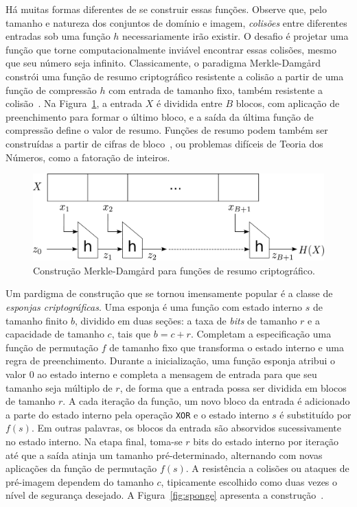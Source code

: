 Há muitas formas diferentes de se construir essas funções.
Observe que, pelo tamanho e natureza dos conjuntos de domínio e imagem, \emph{colisões} entre diferentes entradas sob uma função $h$ necessariamente irão existir. O desafio é projetar uma função que torne computacionalmente inviável encontrar essas colisões, mesmo que seu número seja infinito.
Classicamente, o paradigma Merkle-Damg\aa rd constrói uma função de resumo criptográfico resistente a colisão a partir de uma função de compressão $h$ com entrada de tamanho fixo, também resistente a colisão~\cite{Merkle79,Damgard89a}. Na Figura~\ref{fig:merkle}, a entrada $X$ é dividida entre $B$ blocos, com aplicação de preenchimento para formar o último bloco, e a saída da última função de compressão define o valor de resumo. Funções de resumo podem também ser construídas a partir de cifras de bloco~\cite{PreneelGV93}, ou problemas difíceis de Teoria dos Números, como a fatoração de inteiros.

\begin{figure}[htbp]
\begin{center}
    \includegraphics[scale=0.2]{figures/merkle.pdf}
    \caption{Construção Merkle-Damg\aa rd para funções de resumo criptográfico.}
    \label{fig:merkle}
\end{center}
\end{figure}

Um pardigma de construção que se tornou imensamente popular é a classe de \emph{esponjas criptográficas}. Uma esponja é uma função com estado interno $s$ de tamanho finito $b$, dividido em duas seções: a taxa de \emph{bits} de tamanho $r$ e a capacidade de tamanho $c$, tais que $b = c + r$. Completam a especificação uma função de permutação $f$ de tamanho fixo que transforma o estado interno e uma regra de preenchimento. Durante a inicialização, uma função esponja atribui o valor 0 ao estado interno e completa a mensagem de entrada para que seu tamanho seja múltiplo de $r$, de forma que a entrada possa ser dividida em blocos de tamanho $r$. A cada iteração da função, um novo bloco da entrada é adicionado a parte do estado interno pela operação \texttt{XOR} e o estado interno $s$ é substituído por $f(s)$. Em outras palavras, os blocos da entrada são absorvidos sucessivamente no estado interno. Na etapa final, toma-se $r$ bits do estado interno por iteração até que a saída atinja um tamanho pré-determinado, alternando com novas aplicações da função de permutação $f(s)$. A resistência a colisões ou ataques de pré-imagem dependem do tamanho $c$, tipicamente escolhido como duas vezes o nível de segurança desejado. A Figura~\ref{fig:sponge} apresenta a construção~\cite{BertoniDPA08}.

